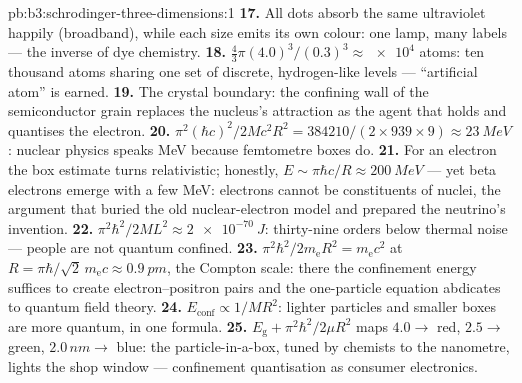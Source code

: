 \begin{solution}{pb:b3:schrodinger-three-dimensions:1}
\textbf{17.} All dots absorb the same ultraviolet happily
(broadband), while each size emits its own colour: one lamp, many
labels --- the inverse of dye chemistry.
\textbf{18.} $\tfrac43\pi(4.0)^3/(0.3)^3 \approx \num{e4}$ atoms:
ten thousand atoms sharing one set of discrete, hydrogen-like
levels --- ``artificial atom'' is earned.
\textbf{19.} The crystal boundary: the confining wall of the
semiconductor grain replaces the nucleus's attraction as the agent
that holds and quantises the electron.
\textbf{20.} $\pi^2(\hbar c)^2/2Mc^2R^2 = 384210/(2 \times 939
\times 9) \approx \qty{23}{MeV}$: nuclear physics speaks MeV because
femtometre boxes do.
\textbf{21.} For an electron the box estimate turns relativistic;
honestly, $E \sim \pi\hbar c/R \approx \qty{200}{MeV}$ --- yet beta
electrons emerge with a few MeV: electrons cannot be constituents of
nuclei, the argument that buried the old nuclear-electron model and
prepared the neutrino's invention.
\textbf{22.} $\pi^2\hbar^2/2ML^2 \approx \qty{2e-70}{J}$:
thirty-nine orders below thermal noise --- people are not quantum
confined.
\textbf{23.} $\pi^2\hbar^2/2m_{\text{e}}R^2 = m_{\text{e}}c^2$ at
$R = \pi\hbar/\sqrt2\,m_{\text{e}}c \approx \qty{0.9}{pm}$, the
Compton scale: there the confinement energy suffices to create
electron--positron pairs and the one-particle equation abdicates to
quantum field theory.
\textbf{24.} $E_{\text{conf}} \propto 1/MR^2$: lighter particles and
smaller boxes are more quantum, in one formula.
\textbf{25.} $E_{\text{g}} + \pi^2\hbar^2/2\mu R^2$ maps $4.0 \to$
red, $2.5 \to$ green, $2.0\,\unit{nm} \to$ blue: the
particle-in-a-box, tuned by chemists to the nanometre, lights the
shop window --- confinement quantisation as consumer electronics.
\end{solution}
